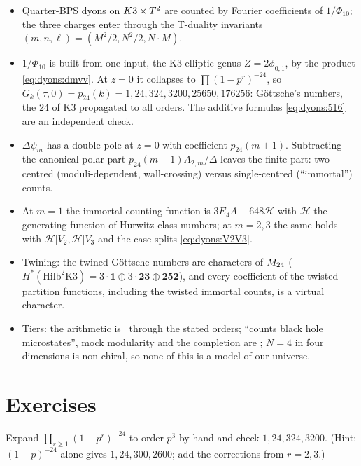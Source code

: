 \begin{summarybox}
\begin{itemize}[leftmargin=*]
\item Quarter-BPS dyons on $K3\times T^2$ are counted by Fourier coefficients of $1/\Phi_{10}$; the
  three charges enter through the T-duality invariants $(m,n,\ell)=(M^2/2,N^2/2,N\cdot M)$.
\item $1/\Phi_{10}$ is built from one input, the K3 elliptic genus $Z=2\phi_{0,1}$, by the
  product \eqref{eq:dyons:dmvv}. At $z=0$ it collapses to $\prod(1-p^r)^{-24}$, so
  $G_k(\tau,0)=p_{24}(k)=1,24,324,3200,25650,176256$: Göttsche's numbers, the $24$ of K3
  propagated to all orders. The additive formulas \eqref{eq:dyons:516} are an independent check.
\item $\Delta\psi_m$ has a double pole at $z=0$ with coefficient $p_{24}(m+1)$. Subtracting the
  canonical polar part $p_{24}(m+1)A_{2,m}/\Delta$ leaves the finite part: two-centred
  (moduli-dependent, wall-crossing) versus single-centred (``immortal'') counts.
\item At $m=1$ the immortal counting function is $3E_4A-648\mathcal H$ with $\mathcal H$ the
  generating function of Hurwitz class numbers; at $m=2,3$ the same holds with
  $\mathcal H|V_2,\mathcal H|V_3$ and the case splits \eqref{eq:dyons:V2V3}.
\item Twining: the twined Göttsche numbers are characters of $M_{24}$
  ($H^*(\mathrm{Hilb}^2\mathrm{K3})=3\cdot\mathbf1\oplus3\cdot\mathbf{23}\oplus\mathbf{252}$),
  and every coefficient of the twisted partition functions, including the twisted immortal
  counts, is a virtual character.
\item Tiers: the arithmetic is \TA\ through the stated orders; ``counts black hole microstates'',
  mock modularity and the completion are \TL; $N=4$ in four dimensions is non-chiral, so none
  of this is a model of our universe.
\end{itemize}
\end{summarybox}

\section*{Exercises}

\begin{exercise}[$\star$]\label{exo:dyons:p24}
Expand $\prod_{r\ge1}(1-p^r)^{-24}$ to order $p^3$ by hand and check $1,24,324,3200$. (Hint:
$(1-p)^{-24}$ alone gives $1,24,300,2600$; add the corrections from $r=2,3$.)
\end{exercise}

